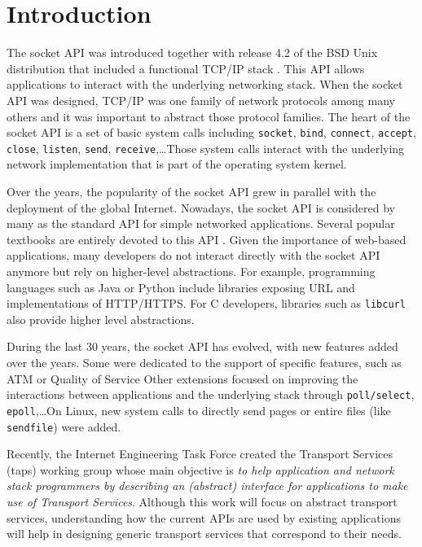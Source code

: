 \section{Introduction}

The socket API was introduced together with release 4.2 of
the BSD Unix distribution that included a functional TCP/IP stack
\cite{Quarterman:BSD}. This API allows applications to interact with
the underlying networking stack. When the socket API
was designed, TCP/IP was one family of network protocols among many
others and it was important to abstract those protocol families.
The heart of the socket API is  a set of basic system calls
including \texttt{socket}, \texttt{bind}, \texttt{connect},
\texttt{accept}, \texttt{close}, \texttt{listen}, \texttt{send},
\texttt{receive},\ldots Those system calls interact with the
underlying network implementation that is part of the operating
system kernel. 

Over the years, the popularity of the socket API grew in parallel
with the deployment of the global Internet. Nowadays, the
socket API is considered by many as the standard API for
simple networked applications. Several popular textbooks are entirely
devoted to this API \cite{Stevens:UNP,donahoo2001pocket}. Given the
importance of web-based applications, many developers do not interact
directly with the socket API anymore but rely on higher-level
abstractions. For example, programming languages such as Java or Python
include libraries exposing URL and implementations of
HTTP/HTTPS. For C developers, libraries such as \texttt{libcurl} 
also provide higher level abstractions.

During the last 30 years, the socket API has evolved, with new features added over the years.
Some were
dedicated to the support of specific features, such as ATM
or Quality of Service
Other extensions \cite{Provos_Scalable:2000,gammo2004comparing}
focused on improving the
interactions between applications and the underlying stack through
\texttt{poll/select}, \texttt{epoll},\ldots On Linux, new system
calls to directly send pages or entire files (like \texttt{sendfile})
were added. 

Recently, the Internet Engineering Task Force created the 
Transport Services (taps) working group whose main objective is
\emph{to help application and network 
stack programmers by describing an (abstract) interface for applications 
to make use of Transport Services}. Although this work will focus on
abstract transport services, understanding how the current APIs
are used by existing applications will help in designing generic transport
services that correspond to their needs.

